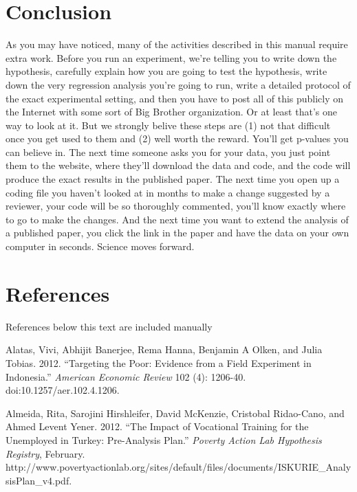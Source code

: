 \documentclass[12pt] {article}
\begin{document}
\section{Conclusion}\label{conclusion}

As you may have noticed, many of the activities described in this manual
require extra work. Before you run an experiment, we're telling you to
write down the hypothesis, carefully explain how you are going to test
the hypothesis, write down the very regression analysis you're going to
run, write a detailed protocol of the exact experimental setting, and
then you have to post all of this publicly on the Internet with some
sort of Big Brother organization. Or at least that's one way to look at
it. But we strongly belive these steps are (1) not that difficult once
you get used to them and (2) well worth the reward. You'll get p-values
you can believe in. The next time someone asks you for your data, you
just point them to the website, where they'll download the data and
code, and the code will produce the exact results in the published
paper. The next time you open up a coding file you haven't looked at in
months to make a change suggested by a reviewer, your code will be so
thoroughly commented, you'll know exactly where to go to make the
changes. And the next time you want to extend the analysis of a
published paper, you click the link in the paper and have the data on
your own computer in seconds. Science moves forward.

\section{References}\label{references}



References below this text are included manually

Alatas, Vivi, Abhijit Banerjee, Rema Hanna, Benjamin A Olken, and Julia
Tobias. 2012. ``Targeting the Poor: Evidence from a Field Experiment in
Indonesia.'' \emph{American Economic Review} 102 (4): 1206-40.
doi:10.1257/aer.102.4.1206.

Almeida, Rita, Sarojini Hirshleifer, David McKenzie, Cristobal
Ridao-Cano, and Ahmed Levent Yener. 2012. ``The Impact of Vocational
Training for the Unemployed in Turkey: Pre-Analysis Plan.''
\emph{Poverty Action Lab Hypothesis Registry}, February.
http://www.povertyactionlab.org/sites/default/files/documents/ISKURIE\_AnalysisPlan\_v4.pdf.
\end{document}
